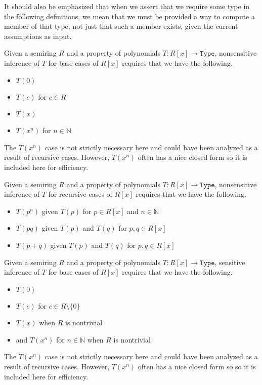 It should also be emphasized that when we assert that we require some type in the following definitions, we mean that we must be provided a way to compute a member of that type, not just that such a member exists, given the current assumptions as input.

\begin{definition}
\label{def:BaseReflection}
\leanok
Given a semiring $R$ and a property of polynomials $T:R[x] \to \mathtt{Type}$, nonsensitive inference of $T$ for base cases of $R[x]$ requires that we have the following.
\begin{itemize}
\item $T(0)$
\item $T(c)$ for $c \in R$
\item $T(x)$
\item $T(x ^ n)$ for $n \in \mathbb{N}$
\end{itemize}
The $T(x ^ n)$ case is not strictly necessary here and could have been analyzed as a result of recursive cases. However, $T(x ^ n)$ often has a nice closed form so it is included here for efficiency.
\end{definition}

\begin{definition}
\label{def:ClosureReflection}
\leanok
Given a semiring $R$ and a property of polynomials $T:R[x] \to \mathtt{Type}$, nonsensitive inference of $T$ for recursive cases of $R[x]$ requires that we have the following.
\begin{itemize}
\item $T(p^n)$ given $T(p)$ for $p \in R[x]$ and $n \in \mathbb{N}$
\item $T(pq)$ given $T(p)$ and $T(q)$ for $p,q \in R[x]$
\item $T(p+q)$ given $T(p)$ and $T(q)$ for $p,q \in R[x]$
\end{itemize}
\end{definition}

\begin{definition}
\label{def:SensitiveBaseReflection}
\leanok
Given a semiring $R$ and a property of polynomials $T:R[x] \to \mathtt{Type}$, sensitive inference of $T$ for base cases of $R[x]$ requires that we have the following.
\begin{itemize}
\item $T(0)$
\item $T(c)$ for $c \in R \setminus \{0\}$
\item $T(x)$ when $R$ is nontrivial
\item and $T(x ^ n)$ for $n \in \mathbb{N}$ when $R$ is nontrivial
\end{itemize}
The $T(x ^ n)$ case is not strictly necessary here and could have been analyzed as a result of recursive cases. However, $T(x ^ n)$ often has a nice closed form so so it is included here for efficiency.
\end{definition}

